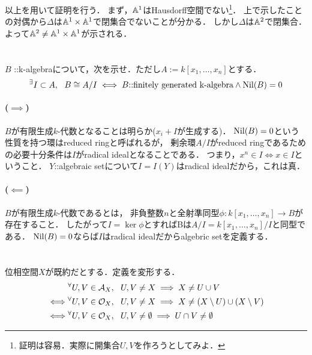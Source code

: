 \documentclass[a4paper]{jsarticle}
\newcommand{\prodsp}{\affine^1 \times \affine^1}
\begin{document}
    以上を用いて証明を行う．
    まず，$\mathbb{A}^1$はHausdorff空間でない\footnote{証明は容易．実際に開集合$U, V$を作ろうとしてみよ．}．
    上で示したことの対偶から$\Delta$は$\prodsp$で閉集合でないことが分かる．
    しかし$\Delta$は$\mathbb{A}^2$で閉集合．
    よって$\affine^2 \neq \prodsp$が示される．

\section{}
    \begin{screen}
        $B$ ::k-algebraについて，次を示せ．ただし$A:=k[x_1, \dots, x_n]$とする．
        \[ {}^{\exists} I \subset A,~~ B \cong A/I \iff B \mbox{::finitely generated k-algebra} \land \operatorname{Nil}(B)=0 \]
    \end{screen}
    \paragraph{($\implies$)}
    $B$が有限生成$k$-代数となることは明らか($x_i+I$が生成する)．
    $\operatorname{Nil}(B)=0$という性質を持つ環はreduced ringと呼ばれるが，
    剰余環$A/I$がreduced ringであるための必要十分条件は$I$がradical idealとなることである．
    つまり，$x^n \in I \iff x \in I$ということ．
    $Y$::algebraic setについて$I=I(Y)$はradical idealだから，これは真．

    \paragraph{($\impliedby$)}
    $B$が有限生成$k$-代数であるとは，
    非負整数$n$と全射準同型$\phi: k[x_1, \dots, x_n] \to B$が存在すること．
    したがって$I=\ker \phi$とすればBは$A/I=k[x_1, \dots, x_n]/I$と同型である．
    $\operatorname{Nil}(B)=0$ならば$I$はradical idealだからalgebric setを定義する．

\section{}
    位相空間$X$が既約だとする．定義を変形する．
    \begin{align*}
        {}&     {}^{\forall} U, V \in \mathcal{A}_{X},~~ U,V \neq X \implies X \neq U \cup V \\
        \iff&   {}^{\forall} U,V \in \mathcal{O}_{X},~~ U,V \neq X \implies X \neq (X \setminus U) \cup (X \setminus V) \\
        \iff&   {}^{\forall} U,V \in \mathcal{O}_{X},~~ U,V \neq \emptyset \implies U \cap V \neq \emptyset
    \end{align*}
\end{document}
